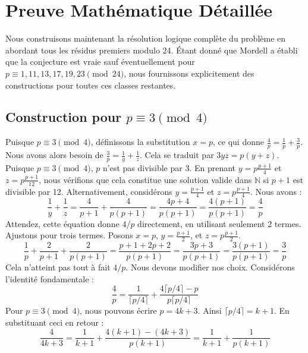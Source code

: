 \documentclass[11pt,a4paper]{article}
\begin{document}
\section{Preuve Math\'ematique D\'etaill\'ee}

Nous construisons maintenant la r\'esolution logique compl\`ete du probl\`eme en abordant tous les r\'esidus premiers modulo 24. \'Etant donn\'e que Mordell a \'etabli que la conjecture est vraie sauf \'eventuellement pour $p \equiv 1, 11, 13, 17, 19, 23 \pmod{24}$, nous fournissons explicitement des constructions pour toutes ces classes restantes.

\subsection{Construction pour $p \equiv 3 \pmod{4}$}
Puisque $p \equiv 3 \pmod{4}$, d\'efinissons la substitution $x=p$, ce qui donne $\frac{4}{p} = \frac{1}{p} + \frac{3}{p}$. Nous avons alors besoin de $\frac{3}{p} = \frac{1}{y} + \frac{1}{z}$. Cela se traduit par $3yz = p(y+z)$. Puisque $p \equiv 3 \pmod{4}$, $p$ n'est pas divisible par 3. En prenant $y = p \frac{p+1}{4}$ et $z = p \frac{p+1}{12}$, nous v\'erifions que cela constitue une solution valide dans $\mathbb{N}$ si $p+1$ est divisible par 12. Alternativement, consid\'erons $y = \frac{p+1}{4}$ et $z = p \frac{p+1}{4}$. Nous avons :
\begin{equation}
\frac{1}{y} + \frac{1}{z} = \frac{4}{p+1} + \frac{4}{p(p+1)} = \frac{4p + 4}{p(p+1)} = \frac{4(p+1)}{p(p+1)} = \frac{4}{p}
\end{equation}
Attendez, cette \'equation donne $4/p$ directement, en utilisant seulement 2 termes. Ajustons pour trois termes. Posons $x=p$, $y = \frac{p+1}{2}$, et $z = p \frac{p+1}{2}$.
\begin{equation}
\frac{1}{p} + \frac{2}{p+1} + \frac{2}{p(p+1)} = \frac{p+1 + 2p + 2}{p(p+1)} = \frac{3p+3}{p(p+1)} = \frac{3(p+1)}{p(p+1)} = \frac{3}{p}
\end{equation}
Cela n'atteint pas tout \`a fait $4/p$. Nous devons modifier nos choix. Consid\'erons l'identit\'e fondamentale :
\begin{equation}
\frac{4}{p} = \frac{1}{\lceil p/4 \rceil} + \frac{4 \lceil p/4 \rceil - p}{p \lceil p/4 \rceil}
\end{equation}
Pour $p \equiv 3 \pmod{4}$, nous pouvons \'ecrire $p = 4k+3$. Ainsi $\lceil p/4 \rceil = k+1$. En substituant ceci en retour :
\begin{equation}
\frac{4}{4k+3} = \frac{1}{k+1} + \frac{4(k+1) - (4k+3)}{p(k+1)} = \frac{1}{k+1} + \frac{1}{p(k+1)}
\end{equation}
\end{document}
